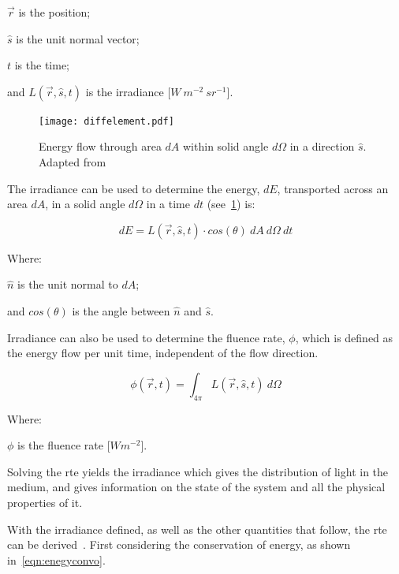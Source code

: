 \indent $\vec{r}$ is the position;

\indent $\hat{s}$ is the unit normal vector;

\indent $t$ is the time;

\indent and $L(\vec{r},\hat{s},t)$ is the irradiance [$W\ m^{-2}\ sr^{-1}$].

\medskip

\begin{figure}[!htb]
	\centering
	\texttt{[image: diffelement.pdf]}
	\caption{Energy flow through area $dA$ within solid angle $d\Omega$ in a direction $\hat{s}$. Adapted from~\cite{wang2012biomedical,chandrasekhar2013radiative}}
	\label{fig:energydiag1}
\end{figure}

The irradiance can be used to determine the energy, $dE$, transported across an area $dA$, in a solid angle $d\Omega$ in a time $dt$ (see~\cref{fig:energydiag1}) is:

\begin{equation}
	dE = L(\vec{r},\hat{s},t) \cdot cos\left(\theta\right)\ dA\ d\Omega\ dt
\end{equation}

\noindent Where:

\indent $\hat{n}$ is the unit normal to $dA$;

\indent and $cos\left(\theta\right)$ is the angle between $\hat{n}$ and $\hat{s}$.

\medskip

Irradiance can also be used to determine the fluence rate, $\phi$, which is defined as the energy flow per unit time, independent of the flow direction.

\begin{equation}
	\phi(\vec{r},t)=\int_{4\pi}L(\vec{r},\hat{s},t)\ d\Omega
\end{equation}

\noindent Where:

\indent $\phi$ is the fluence rate [$W m^{-2}$].

\medskip

Solving the \gls*{rte} yields the irradiance which gives the distribution of light in the medium, and gives information on the state of the system and all the physical properties of it.

With the irradiance defined, as well as the other quantities that follow, the \gls*{rte} can be derived~\cite{chandrasekhar2013radiative,wang2012biomedical}. First considering the conservation of energy, as shown in~\cref{eqn:enegyconvo}.

